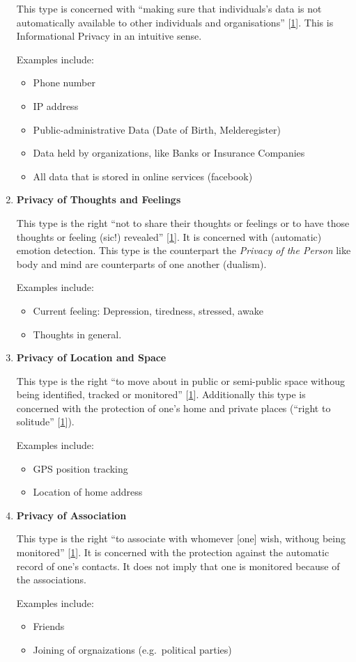 \begin{enumerate}
This type is concerned with ``making sure that individuals's data is not
automatically available to other individuals and organisations''
{[}\hyperref[references]{1}{]}. This is Informational Privacy in an
intuitive sense.

Examples include:
\begin{itemize}
\item Phone number
\item IP address
\item Public-administrative Data (Date of Birth, Melderegister)
\item Data held by organizations, like Banks or Insurance Companies
\item All data that is stored in online services (facebook)
\end{itemize}

\item \textbf{Privacy of Thoughts and Feelings}

This type is the right ``not to share their thoughts or feelings or to
have those thoughts or feeling (sic!) revealed''
{[}\hyperref[references]{1}{]}. It is concerned with (automatic) emotion
detection. This type is the counterpart the \emph{Privacy of the Person}
like body and mind are counterparts of one another (dualism).

Examples include:
\begin{itemize}
\item Current feeling: Depression, tiredness, stressed, awake
\item Thoughts in general.
\end{itemize}

\item \textbf{Privacy of Location and Space}

This type is the right ``to move about in public or semi-public space
withoug being identified, tracked or monitored'' {[}\hyperref[references]{1}{]}.
Additionally this type is concerned with the protection of one's home and private places (``right to solitude'' {[}\hyperref[references]{1}{]}).

Examples include:
\begin{itemize}
\item GPS position tracking
\item Location of home address
\end{itemize}

\item \textbf{Privacy of Association}

This type is the right ``to associate with whomever {[}one{]} wish, withoug being monitored'' {[}\hyperref[references]{1}{]}.
It is concerned with the protection against the automatic record of one's contacts.
It does not imply that one is monitored because of the associations.

Examples include:
\begin{itemize}
\item Friends
\item Joining of orgnaizations (e.g.~political parties)
\end{itemize}
\end{enumerate}


